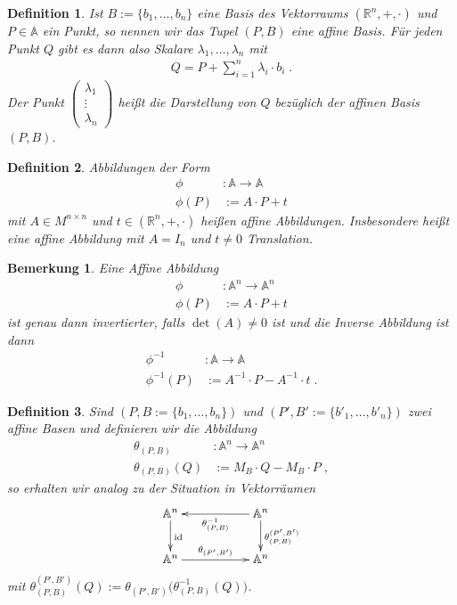\documentclass[]{article}
\newtheorem{Definition}{Definition}
\newtheorem{Bemerkung}{Bemerkung}
\begin{document}
\begin{Definition}
Ist $B:= \{b_1, \hdots , b_n \}$ eine Basis des Vektorraums  $(\mathbb{R}^n, + , \cdot )$ und $P \in \mathbb{A}$ ein Punkt, so nennen wir das Tupel
$(P, B)$ eine affine Basis. Für jeden Punkt $Q$ gibt es dann also Skalare $\lambda_1,\hdots ,\lambda_n$ mit 
\begin{align*}
Q = P + \sum_{i=1}^{n} \lambda_i \cdot b_i  \; .
\end{align*}
Der Punkt $\begin{pmatrix}  \lambda_1 \\  \vdots \\  \lambda_n \end{pmatrix}$ heißt die Darstellung von $Q$ bezüglich der affinen Basis $(P,B)$. 
\end{Definition}



\begin{Definition}
Abbildungen der Form
\begin{align*}
\phi &: \mathbb{A} \to \mathbb{A} \\
\phi(P) & := A \cdot P + t
\end{align*} 
mit $A \in M^{n \times n}$ und $t \in (\mathbb{R}^n, + , \cdot )$ heißen affine Abbildungen.
Insbesondere heißt eine affine Abbildung mit $A = I_n$ und $t \neq 0$ Translation.
\end{Definition}

\begin{Bemerkung}
Eine Affine Abbildung
\begin{align*}
\phi &: \mathbb{A}^n \to \mathbb{A}^n \\
\phi(P) & := A \cdot P + t
\end{align*} 
ist genau dann invertierter, falls $\det(A) \neq 0$ ist und die Inverse Abbildung ist dann
\begin{align*}
\phi^{-1} &: \mathbb{A} \to \mathbb{A} \\
\phi^{-1}(P) & := A^{-1} \cdot P - A^{-1} \cdot t \; .
\end{align*} 
\end{Bemerkung}


\begin{Definition}
Sind $(P,B:= \{b_1, \hdots , b_n \})$  und $(P',B':= \{b'_1, \hdots , b'_n \})$ zwei affine Basen  und definieren wir 
die Abbildung
\begin{align*}
\theta_{(P,B)} & :  \mathbb{A}^n \to \mathbb{A}^n \\
\theta_{(P,B)}(Q) & := M_B \cdot Q - M_B \cdot P \; ,
\end{align*}
so erhalten wir analog zu der Situation in Vektorräumen
\begin{align*}
\xymatrix{
\mathbb{A}^n  \ar[d]^{\text{id}} &  & \ar[ll]^{\theta_{(P,B)}^{-1}} \mathbb{A}^n \ar[d]^{\theta_{(P,B)}^{(P',B')}} \\
\mathbb{A}^n  \ar[rr]^{\theta_{(P',B')}} & &  \mathbb{A}^n
}
\end{align*}
mit $\theta_{(P,B)}^{(P',B')} (Q) :=   \theta_{(P',B')} \biggl ( \theta_{(P,B)}^{-1} (Q) \biggr)$.
\end{Definition}
\end{document}
